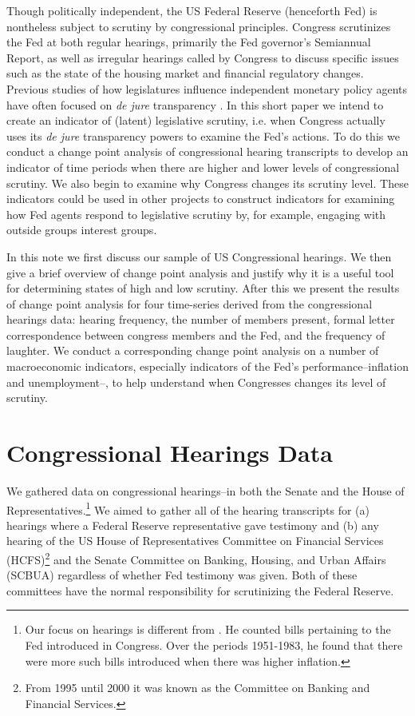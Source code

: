 \documentclass[a4paper]{article}\usepackage[]{graphicx}\usepackage[]{color}
\begin{document}
Though politically independent, the US Federal Reserve (henceforth Fed) is nontheless subject to scrutiny by congressional principles. Congress scrutinizes the Fed at both regular hearings, primarily the Fed governor's Semiannual Report, as well as irregular hearings called by Congress to discuss specific issues such as the state of the housing market and financial regulatory changes. Previous studies of how legislatures influence independent monetary policy agents have often focused on \emph{de jure} transparency \citep[for example][]{Stasavage2003}. In this short paper we intend to create an indicator of (latent) legislative scrutiny, i.e. when Congress actually uses its \emph{de jure} transparency powers to examine the Fed's actions. To do this we conduct a change point analysis \citep{SenSrivastava1975, EckleyFearnheadKillick2011,Killick2012, Matteson2012, Killick2013} of congressional hearing transcripts to develop an indicator of time periods when there are higher and lower levels of congressional scrutiny. We also begin to examine why Congress changes its scrutiny level. These indicators could be used in other projects to construct indicators for examining how Fed agents respond to legislative scrutiny by, for example, engaging with outside groups interest groups. 

In this note we first discuss our sample of US Congressional hearings. We then give a brief overview of change point analysis and justify why it is a useful tool for determining states of high and low scrutiny. After this we present the results of change point analysis for four time-series derived from the congressional hearings data: hearing frequency, the number of members present, formal letter correspondence between congress members and the Fed, and the frequency of laughter. We conduct a corresponding change point analysis on a number of macroeconomic indicators, especially indicators of the Fed's performance--inflation and unemployment--, to help understand when Congresses changes its level of scrutiny.  


\section{Congressional Hearings Data}

We gathered data on congressional hearings--in both the Senate and the House of Representatives.\footnote{Our focus on hearings is different from \cite{Kettl1988}. He counted bills pertaining to the Fed introduced in Congress. Over the periods 1951-1983, he found that there were more such bills introduced when there was higher inflation.} We aimed to gather all of the hearing transcripts for (a) hearings where a Federal Reserve representative gave testimony and (b) any hearing of the US House of Representatives Committee on Financial Services (HCFS)\footnote{From 1995 until 2000 it was known as the Committee on Banking and Financial Services.} and the Senate Committee on Banking, Housing, and Urban Affairs (SCBUA) regardless of whether Fed testimony was given. Both of these committees have the normal responsibility for scrutinizing the Federal Reserve.
\end{document}
